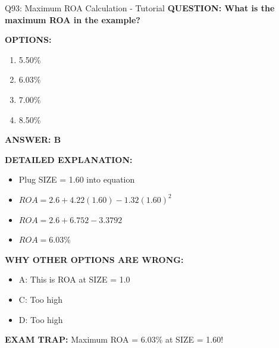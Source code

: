 \documentclass[8pt]{beamer}
\begin{document}
	\begin{frame}{Q93: Maximum ROA Calculation - Tutorial}
		\fontsize{6.5}{7.5}\selectfont
		\textbf{QUESTION: What is the maximum ROA in the example?}
		
		\vspace{0.1cm}
		\textbf{OPTIONS:}
		\begin{enumerate}
			\item 5.50\%
			\item 6.03\%
			\item 7.00\%
			\item 8.50\%
		\end{enumerate}
		
		\vspace{0.1cm}
		\textcolor{myblue}{\textbf{ANSWER: B}}
		
		\vspace{0.1cm}
		\textbf{DETAILED EXPLANATION:}
		\begin{itemize}
			\item Plug SIZE = 1.60 into equation
			\item $ROA = 2.6 + 4.22(1.60) - 1.32(1.60)^2$
			\item $ROA = 2.6 + 6.752 - 3.3792$
			\item $ROA = 6.03\%$
		\end{itemize}
		
		\vspace{0.1cm}
		\textcolor{myred}{\textbf{WHY OTHER OPTIONS ARE WRONG:}}
		\begin{itemize}
			\item \textcolor{myred}{A:} This is ROA at SIZE = 1.0
			\item \textcolor{myred}{C:} Too high
			\item \textcolor{myred}{D:} Too high
		\end{itemize}
		
		\textcolor{myred}{\textbf{EXAM TRAP:}} Maximum ROA = \textcolor{myblue}{6.03\%} at SIZE = 1.60!
	\end{frame}
	
\end{document}
